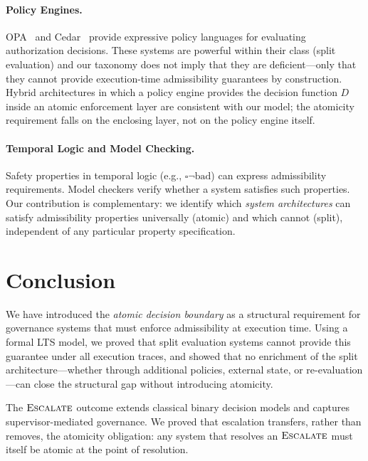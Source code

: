 \documentclass[11pt]{article}
\theoremstyle{plain}
\theoremstyle{definition}
\theoremstyle{remark}
\newcommand{\Escalate}{\textsc{Escalate}}
\begin{document}
\paragraph{Policy Engines.}
OPA~\cite{opa} and Cedar~\cite{cedar} provide expressive policy languages for
evaluating authorization decisions.  These systems are powerful within their
class (split evaluation) and our taxonomy does not imply that they are
deficient---only that they cannot provide execution-time admissibility
guarantees by construction.  Hybrid architectures in which a policy engine
provides the decision function $D$ inside an atomic enforcement layer are
consistent with our model; the atomicity requirement falls on the enclosing
layer, not on the policy engine itself.

\paragraph{Temporal Logic and Model Checking.}
Safety properties in temporal logic (e.g., $\square \neg \mathrm{bad}$) can
express admissibility requirements.  Model checkers verify whether a system
satisfies such properties.  Our contribution is complementary: we identify
which \emph{system architectures} can satisfy admissibility properties
universally (atomic) and which cannot (split), independent of any particular
property specification.

\section{Conclusion}
\label{sec:conclusion}

We have introduced the \emph{atomic decision boundary} as a structural
requirement for governance systems that must enforce admissibility at execution
time.  Using a formal LTS model, we proved that split evaluation systems
cannot provide this guarantee under all execution traces, and showed that
no enrichment of the split architecture---whether through additional policies,
external state, or re-evaluation---can close the structural gap without
introducing atomicity.

The $\Escalate$ outcome extends classical binary decision models and captures
supervisor-mediated governance.  We proved that escalation transfers, rather
than removes, the atomicity obligation: any system that resolves an
$\Escalate$ must itself be atomic at the point of resolution.
\end{document}
